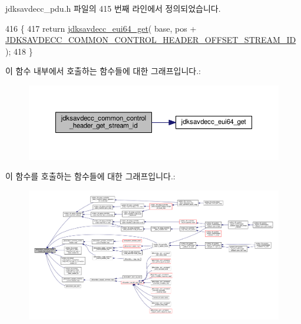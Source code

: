 jdksavdecc\+\_\+pdu.\+h 파일의 415 번째 라인에서 정의되었습니다.


\begin{DoxyCode}
416 \{
417     \textcolor{keywordflow}{return} \hyperlink{group__eui64_ga2652311a25a6b91cddbed75c108c7031}{jdksavdecc\_eui64\_get}( base, pos + 
      \hyperlink{group__jdksavdecc__avtp__common__control__header_ga74d94705d74110c7a4fbc7c3d70dfc63}{JDKSAVDECC\_COMMON\_CONTROL\_HEADER\_OFFSET\_STREAM\_ID} );
418 \}
\end{DoxyCode}


이 함수 내부에서 호출하는 함수들에 대한 그래프입니다.\+:
\nopagebreak
\begin{figure}[H]
\begin{center}
\leavevmode
\includegraphics[width=350pt]{group__jdksavdecc__avtp__common__control__header_ga99181000ee374936c8518f657fa9f5cd_cgraph}
\end{center}
\end{figure}




이 함수를 호출하는 함수들에 대한 그래프입니다.\+:
\nopagebreak
\begin{figure}[H]
\begin{center}
\leavevmode
\includegraphics[width=350pt]{group__jdksavdecc__avtp__common__control__header_ga99181000ee374936c8518f657fa9f5cd_icgraph}
\end{center}
\end{figure}


